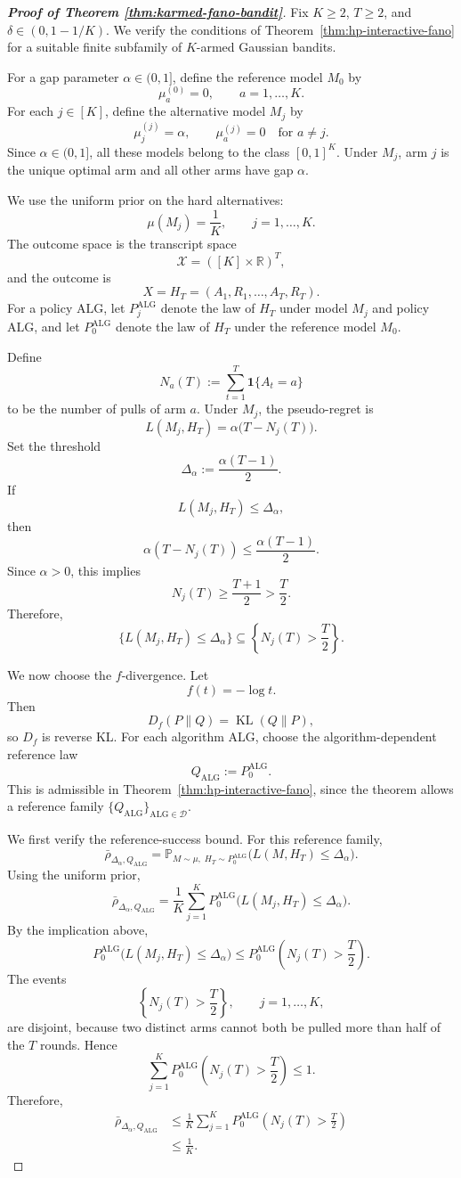 \documentclass[journal]{IEEEtran}
\newcommand{\ALG}{\mathrm{ALG}}
\newcommand{\KL}{\operatorname{KL}}
\begin{document}
\begin{proof}[\textbf{Proof of Theorem \ref{thm:karmed-fano-bandit}}]
Fix \(K\ge2\), \(T\ge2\), and \(\delta\in(0,1-1/K)\). We verify the
conditions of Theorem~\ref{thm:hp-interactive-fano} for a suitable finite
subfamily of \(K\)-armed Gaussian bandits.

For a gap parameter \(\alpha\in(0,1]\), define the reference model \(M_0\) by
\[
\mu_a^{(0)}=0,
\qquad a=1,\dots,K.
\]
For each \(j\in[K]\), define the alternative model \(M_j\) by
\[
\mu_j^{(j)}=\alpha,
\qquad
\mu_a^{(j)}=0
\quad\text{for }a\neq j.
\]
Since \(\alpha\in(0,1]\), all these models belong to the class
\([0,1]^K\). Under \(M_j\), arm \(j\) is the unique optimal arm and all other
arms have gap \(\alpha\).

We use the uniform prior on the hard alternatives:
\[
\mu(M_j)=\frac1K,
\qquad j=1,\dots,K.
\]
The outcome space is the transcript space
\[
\mathcal X=([K]\times\mathbb R)^T,
\]
and the outcome is
\[
X=H_T=(A_1,R_1,\dots,A_T,R_T).
\]
For a policy \(\ALG\), let \(P_j^\ALG\) denote the law of \(H_T\) under model
\(M_j\) and policy \(\ALG\), and let \(P_0^\ALG\) denote the law of \(H_T\)
under the reference model \(M_0\).

Define
\[
N_a(T):=\sum_{t=1}^T \mathbf 1\{A_t=a\}
\]
to be the number of pulls of arm \(a\). Under \(M_j\), the pseudo-regret is
\[
L(M_j,H_T)
=
\alpha\bigl(T-N_j(T)\bigr).
\]
Set the threshold
\[
\Delta_\alpha:=\frac{\alpha(T-1)}{2}.
\]
If
\[
L(M_j,H_T)\le \Delta_\alpha,
\]
then
\[
\alpha(T-N_j(T))
\le
\frac{\alpha(T-1)}{2}.
\]
Since \(\alpha>0\), this implies
\[
N_j(T)\ge \frac{T+1}{2}>\frac T2.
\]
Therefore,
\[
\{L(M_j,H_T)\le \Delta_\alpha\}
\subseteq
\left\{N_j(T)>\frac T2\right\}.
\]

We now choose the \(f\)-divergence. Let
\[
f(t)=-\log t.
\]
Then
\[
D_f(P\|Q)=\KL(Q\|P),
\]
so \(D_f\) is reverse KL. For each algorithm \(\ALG\), choose the
algorithm-dependent reference law
\[
Q_\ALG:=P_0^\ALG.
\]
This is admissible in Theorem~\ref{thm:hp-interactive-fano}, since the theorem
allows a reference family \(\{Q_\ALG\}_{\ALG\in\mathcal D}\).

We first verify the reference-success bound. For this reference family,
\[
\bar\rho_{\Delta_\alpha,Q_\ALG}
=
\mathbb P_{M\sim\mu,\;H_T\sim P_0^\ALG}
\bigl(L(M,H_T)\le \Delta_\alpha\bigr).
\]
Using the uniform prior,
\[
\bar\rho_{\Delta_\alpha,Q_\ALG}
=
\frac1K
\sum_{j=1}^K
P_0^\ALG
\bigl(L(M_j,H_T)\le \Delta_\alpha\bigr).
\]
By the implication above,
\[
P_0^\ALG
\bigl(L(M_j,H_T)\le \Delta_\alpha\bigr)
\le
P_0^\ALG
\left(N_j(T)>\frac T2\right).
\]
The events
\[
\left\{N_j(T)>\frac T2\right\},
\qquad j=1,\dots,K,
\]
are disjoint, because two distinct arms cannot both be pulled more than half
of the \(T\) rounds. Hence
\[
\sum_{j=1}^K
P_0^\ALG
\left(N_j(T)>\frac T2\right)
\le 1.
\]
Therefore,
\[
\begin{aligned}
\bar\rho_{\Delta_\alpha,Q_\ALG}
&\le
\frac1K
\sum_{j=1}^K
P_0^\ALG
\left(N_j(T)>\frac T2\right)\\
&\le
\frac1K.
\end{aligned}
\]





\end{proof}
\end{document}
